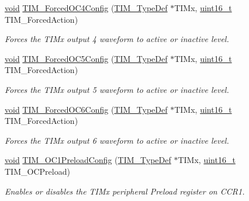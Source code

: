 \begin{DoxyCompactItemize}
\hyperlink{group___n_a_m_e_ga18028b8badbf1ea7e704ccac3c488e82}{void} \hyperlink{group___t_i_m___group2_gaf0a0bbe74251e56d4b835d20b0a3aa63}{T\-I\-M\-\_\-\-Forced\-O\-C4\-Config} (\hyperlink{struct_t_i_m___type_def}{T\-I\-M\-\_\-\-Type\-Def} $\ast$T\-I\-Mx, \hyperlink{stdint_8h_a273cf69d639a59973b6019625df33e30}{uint16\-\_\-t} T\-I\-M\-\_\-\-Forced\-Action)
\begin{DoxyCompactList}\small\item\em Forces the T\-I\-Mx output 4 waveform to active or inactive level. \end{DoxyCompactList}\item 
\hyperlink{group___n_a_m_e_ga18028b8badbf1ea7e704ccac3c488e82}{void} \hyperlink{group___t_i_m___group2_gae8c9211bf4ce47de464b6a9e2e59bf36}{T\-I\-M\-\_\-\-Forced\-O\-C5\-Config} (\hyperlink{struct_t_i_m___type_def}{T\-I\-M\-\_\-\-Type\-Def} $\ast$T\-I\-Mx, \hyperlink{stdint_8h_a273cf69d639a59973b6019625df33e30}{uint16\-\_\-t} T\-I\-M\-\_\-\-Forced\-Action)
\begin{DoxyCompactList}\small\item\em Forces the T\-I\-Mx output 5 waveform to active or inactive level. \end{DoxyCompactList}\item 
\hyperlink{group___n_a_m_e_ga18028b8badbf1ea7e704ccac3c488e82}{void} \hyperlink{group___t_i_m___group2_ga0f1d0424771a5e816a86fc60638732bf}{T\-I\-M\-\_\-\-Forced\-O\-C6\-Config} (\hyperlink{struct_t_i_m___type_def}{T\-I\-M\-\_\-\-Type\-Def} $\ast$T\-I\-Mx, \hyperlink{stdint_8h_a273cf69d639a59973b6019625df33e30}{uint16\-\_\-t} T\-I\-M\-\_\-\-Forced\-Action)
\begin{DoxyCompactList}\small\item\em Forces the T\-I\-Mx output 6 waveform to active or inactive level. \end{DoxyCompactList}\item 
\hyperlink{group___n_a_m_e_ga18028b8badbf1ea7e704ccac3c488e82}{void} \hyperlink{group___t_i_m___group2_ga60e6c29ad8f919bef616cf8e3306dd64}{T\-I\-M\-\_\-\-O\-C1\-Preload\-Config} (\hyperlink{struct_t_i_m___type_def}{T\-I\-M\-\_\-\-Type\-Def} $\ast$T\-I\-Mx, \hyperlink{stdint_8h_a273cf69d639a59973b6019625df33e30}{uint16\-\_\-t} T\-I\-M\-\_\-\-O\-C\-Preload)
\begin{DoxyCompactList}\small\item\em Enables or disables the T\-I\-Mx peripheral Preload register on C\-C\-R1. \end{DoxyCompactList}\item 

\end{DoxyCompactItemize}
